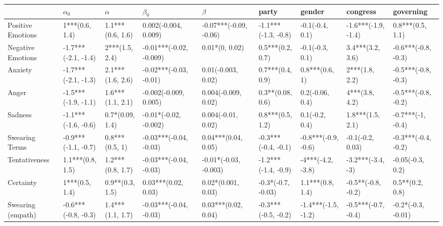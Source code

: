 \begin{table}[h]\centering
\begin{adjustbox}{width=\linewidth, center}
	\begin{tabular}{lllllllll}
	\toprule
	{} &           $\alpha_0$ &             $\alpha$ &                $\beta_0$ &                 $\beta$ &                party &               gender &             congress &            governing \\
	\midrule
	Positive Emotions     &       1***(0.6, 1.4) &     1.1***(0.6, 1.6) &     0.002(-0.004, 0.009) &  -0.07***(-0.09, -0.06) &  -1.1***(-1.3, -0.8) &      -0.1(-0.4, 0.1) &  -1.6***(-1.9, -1.4) &     0.8***(0.5, 1.1) \\
	Negative Emotions     &  -1.7***(-2.1, -1.4) &       2***(1.5, 2.4) &  -0.01***(-0.02, -0.009) &          0.01*(0, 0.02) &     0.5***(0.2, 0.7) &      -0.1(-0.3, 0.1) &     3.4***(3.2, 3.6) &  -0.6***(-0.8, -0.3) \\
	Anxiety               &  -1.7***(-2.1, -1.3) &     2.1***(1.6, 2.6) &   -0.02***(-0.03, -0.01) &      0.01(-0.003, 0.02) &     0.7***(0.4, 0.9) &       0.8***(0.6, 1) &       2***(1.8, 2.2) &  -0.5***(-0.8, -0.3) \\
	Anger                 &  -1.5***(-1.9, -1.1) &     1.6***(1.1, 2.1) &    -0.002(-0.009, 0.005) &     0.004(-0.009, 0.02) &     0.3**(0.08, 0.6) &      0.2(-0.06, 0.4) &       4***(3.8, 4.2) &  -0.5***(-0.8, -0.2) \\
	Sadness               &  -1.1***(-1.6, -0.6) &      0.7*(0.09, 1.4) &    -0.01*(-0.02, -0.002) &      0.004(-0.01, 0.02) &     0.8***(0.5, 1.2) &       0.1(-0.2, 0.4) &     1.8***(1.5, 2.1) &    -0.7***(-1, -0.4) \\
	Swearing Terms        &  -0.9***(-1.1, -0.7) &       0.8***(0.5, 1) &   -0.03***(-0.04, -0.03) &     0.04***(0.04, 0.05) &  -0.3***(-0.4, -0.1) &  -0.8***(-0.9, -0.6) &     -0.1(-0.2, 0.03) &  -0.3***(-0.4, -0.2) \\
	Tentativeness         &     1.1***(0.8, 1.5) &     1.2***(0.8, 1.7) &   -0.03***(-0.04, -0.03) &   -0.01*(-0.03, -0.003) &  -1.2***(-1.4, -0.9) &    -4***(-4.2, -3.8) &    -3.2***(-3.4, -3) &     -0.05(-0.3, 0.2) \\
	Certainty             &       1***(0.5, 1.4) &      0.9**(0.3, 1.5) &      0.03***(0.02, 0.03) &      0.02*(0.001, 0.03) &   -0.3*(-0.7, -0.03) &     1.1***(0.8, 1.4) &   -0.5**(-0.8, -0.2) &      0.5**(0.2, 0.8) \\
	Swearing (empath)     &  -0.6***(-0.8, -0.3) &     1.4***(1.1, 1.7) &   -0.03***(-0.04, -0.03) &     0.03***(0.02, 0.04) &  -0.3***(-0.5, -0.2) &  -1.4***(-1.5, -1.2) &  -0.5***(-0.7, -0.4) &   -0.2*(-0.3, -0.01) \\

\end{tabular}
\end{adjustbox}
\end{table}

